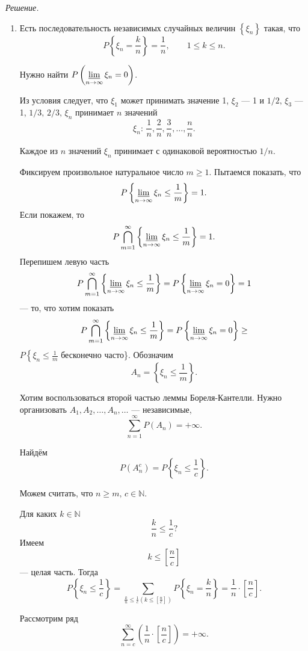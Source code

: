 \textit{Решение.}
\begin{enumerate}[label=\alph*)]
\item Есть последовательность независимых случайных величин $ \left\{ \xi_n \right\} $ такая, что
$$P \left\{ \xi_n = \frac{k}{n} \right\} =
\frac{1}{n}, \qquad
1 \leq k \leq n.$$

Нужно найти $P \left( \varliminf \limits_{n \to \infty } \xi_n = 0 \right) $.

Из условия следует, что $ \xi_1$ может принимать значение 1, $ \xi_2$ --- 1 и $1/2, \, \xi_3$ --- 1, $1/3, \, 2/3, \, \xi_n$ принимает $n$ значений
$$ \xi_n: \, \frac{1}{n}, \frac{2}{n}, \frac{3}{n}, \dotsc, \frac{n}{n}.$$

Каждое из $n$ значений $ \xi_n$ принимает с одинаковой вероятностью $1/n$.

Фиксируем произвольное натуральное число $m \geq 1$.
Пытаемся показать, что
$$P \left\{ \varliminf \limits_{n \to \infty } \xi_n \leq \frac{1}{m} \right\} =
1.$$
Если покажем, то
$$P \bigcap \limits_{m=1}^{ \infty } \left\{ \varliminf \limits_{n \to \infty } \xi_n \leq \frac{1}{m} \right\} =
1.$$
Перепишем левую часть
$$P \bigcap \limits_{m=1}^{ \infty } \left\{ \varliminf \limits_{n \to \infty } \xi_n \leq \frac{1}{m} \right\} =
P \left\{ \varliminf \limits_{n \to \infty } \xi_n = 0 \right\} =
1$$ ---
то, что хотим показать
$$P \bigcap \limits_{m=1}^{ \infty } \left\{ \varliminf \limits_{n \to \infty } \xi_n \leq \frac{1}{m} \right\} =
P \left\{ \varliminf \limits_{n \to \infty } \xi_n = 0 \right\} \geq$$
$P \left\{ \xi_n \leq \frac{1}{m} \right.$ бесконечно часто\}.
Обозначим
$$A_n =
\left\{ \xi_n \leq \frac{1}{m} \right\}.$$

Хотим воспользоваться второй частью леммы Бореля-Кантелли.
Нужно организовать $A_1, A_2, \dotsc, A_n, \dotsc $ --- независимые,
$$ \sum \limits_{n=1}^{ \infty } P \left( A_n \right) =
+ \infty.$$

Найдём
$$P \left( A_n^c \right) =
P \left\{ \xi_n \leq \frac{1}{c} \right\}.$$

Можем считать, что $n \geq m, \, c \in \mathbb{N}$.

Для каких $k \in \mathbb{N}$
$$ \frac{k}{n} \leq \frac{1}{c}?$$
Имеем
$$k \leq \left[ \frac{n}{c} \right] $$ ---
целая часть.
Тогда
$$P \left\{ \xi_n \leq \frac{1}{c} \right\} =
\sum \limits_{ \frac{k}{n} \leq \frac{1}{c} \left( k \leq \left[ \frac{n}{c} \right] \right) } P \left\{ \xi_n = \frac{k}{n} \right\} =
\frac{1}{n} \cdot \left[ \frac{n}{c} \right].$$

Рассмотрим ряд
$$ \sum \limits_{n=c}^{ \infty } \left( \frac{1}{n} \cdot \left[ \frac{n}{c} \right] \right) =
+ \infty.$$


\end{enumerate}
